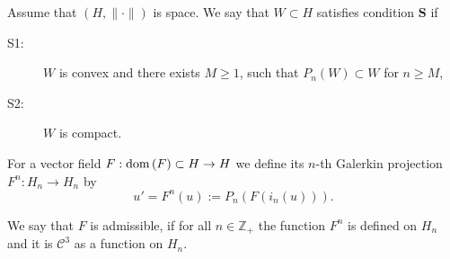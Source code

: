 \begin{definition}
	Assume that $(H,\|\cdot\|)$ is \gss space. We say that $W\subset H$ satisfies condition $\mathbf{S}$ if
	\begin{description}
		\item[S1:] $W$ is convex and there exists $M \geq 1$, such that $P_n(W) \subset W$
		for $n \geq M$,
		\item[S2:] $W$ is compact.
	\end{description}
\end{definition}



For a vector field $F:{\rm dom}\,(F)\subset H\to H$ we define its $n$-th Galerkin projection $F^n:H_n\to H_n$ by
\begin{equation}\label{eq:GalerkinODE}
u'=F^n(u) :=P_n(F(i_n(u))).
\end{equation}



\begin{definition}
  We say that $F$ is admissible, if for all $n\in\mathbb Z_+$  the function $F^n$ is defined on $H_n$ and it is $\mathcal{C}^3$ as a function on $H_n$.
\end{definition}





